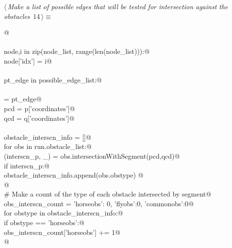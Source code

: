 \documentclass[11.5pt]{report}
\begin{document}
\begin{flushleft} \small
\begin{minipage}{\linewidth}\label{scrap16}\raggedright\small
{} $\langle\,${\itshape Make a list of possible edges that will be tested for intersection against the obstacles}\nobreak\ {\footnotesize {14}}$\,\rangle\equiv$
\vspace{-1ex}
\begin{list}{}{} \item
\mbox{}\verb@   @\\
\mbox{}\verb@@\\
\mbox{}\verb@for node,i in zip(node_list, range(len(node_list))):@\\
\mbox{}\verb@    node['idx'] = i@\\
\mbox{}\verb@@\\
\mbox{}\verb@for pt_edge in possible_edge_list:@\\
\mbox{}\verb@@\\
\mbox{}\verb@             [p,q] = pt_edge@\\
\mbox{}\verb@             pcd = p['coordinates']@\\
\mbox{}\verb@             qcd = q['coordinates']@\\
\mbox{}\verb@@\\
\mbox{}\verb@             obstacle_interscn_info = []@\\
\mbox{}\verb@             for obs in run.obstacle_list:@\\
\mbox{}\verb@                   (interscn_p, _) = obs.intersectionWithSegment(pcd,qcd)@\\
\mbox{}\verb@                   if interscn_p:@\\
\mbox{}\verb@                       obstacle_interscn_info.append(obs.obstype)    @\\
\mbox{}\verb@ @\\
\mbox{}\verb@             # Make a count of the type of each obstacle intersected by segment@\\
\mbox{}\verb@             obs_interscn_count = {'horseobs': 0, 'flyobs':0, 'commonobs':0}@\\
\mbox{}\verb@             for obstype in obstacle_interscn_info:@\\
\mbox{}\verb@                if   obstype == 'horseobs':@\\
\mbox{}\verb@                         obs_interscn_count['horseobs']  += 1@\\
\mbox{}\verb@                 @\\

\end{list}
\end{minipage}
\end{flushleft}
\end{document}
